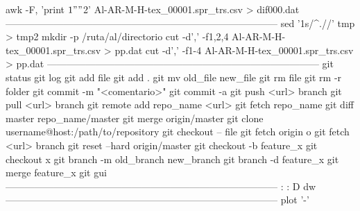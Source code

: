 awk -F, '{print $1 " " $2}' Al-AR-M-H-tex_00001.spr_trs.csv > dif000.dat
------------------------------------------------------------------------------------
sed '1s/^.//' tmp > tmp2
mkdir -p /ruta/al/directorio
cut -d',' -f1,2,4 Al-AR-M-H-tex_00001.spr_trs.csv > pp.dat
cut -d',' -f1-4 Al-AR-M-H-tex_00001.spr_trs.csv > pp.dat
------------------------------------------------------------------------------------
git status
git log
git add file
git add .
git mv old_file new_file
git rm file
git rm -r folder
git commit -m "<comentario>"
git commit -a
git push <url> branch
git pull <url> branch
git remote add repo_name <url>
git fetch repo_name
git diff master repo_name/master
git merge origin/master
git clone username@host:/path/to/repository
git checkout -- file
git fetch origin o git fetch <url> branch
git reset --hard origin/master
git checkout -b feature_x
git checkout x
git branch -m old_branch new_branch
git branch -d feature_x
git merge feature_x
git gui
------------------------------------------------------------------------------------
:%
:%
D
dw
------------------------------------------------------------------------------------
plot '-'
